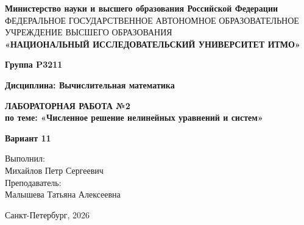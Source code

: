 \documentclass[a4paper,12pt]{article}
\begin{document}
\begin{titlepage}
    \centering
    {\fontsize{11}{13}\selectfont \textbf{Министерство науки и высшего образования Российской Федерации}} \\
    {\fontsize{7}{10}\selectfont ФЕДЕРАЛЬНОЕ ГОСУДАРСТВЕННОЕ АВТОНОМНОЕ ОБРАЗОВАТЕЛЬНОЕ УЧРЕЖДЕНИЕ ВЫСШЕГО ОБРАЗОВАНИЯ} \\
    \vspace{0.2cm} 
    {\fontsize{14}{17}\selectfont \textbf{«НАЦИОНАЛЬНЫЙ ИССЛЕДОВАТЕЛЬСКИЙ УНИВЕРСИТЕТ ИТМО»}}
    
    \vspace{1cm} 
    
    {\fontsize{12}{14}\selectfont \textbf{Группа P3211}}
    
    \vspace{1cm}
    
    {\fontsize{12}{14}\selectfont \textbf{Дисциплина: Вычислительная математика}}
    
    \vspace*{\fill}
    
    {\fontsize{18}{22}\selectfont \textbf{ЛАБОРАТОРНАЯ РАБОТА №2}} \\
    \vspace{0.5cm}
    {\fontsize{14}{17}\selectfont \textbf{по теме: «Численное решение нелинейных уравнений и систем»}}
    
    \vspace{2cm}
    
    {\fontsize{12}{14}\selectfont \textbf{Вариант 11}}
    
    \vspace{2cm}
    
    \begin{flushright}
        \fontsize{12}{14}\selectfont
        Выполнил: \\
        Михайлов Петр Сергеевич \\
        \vspace{1em}
        Преподаватель: \\
        Малышева Татьяна Алексеевна
    \end{flushright}
    
    \vfill
    
    {\fontsize{12}{14}\selectfont
    Санкт-Петербург, 2026
    }
\end{titlepage}
\end{document}
